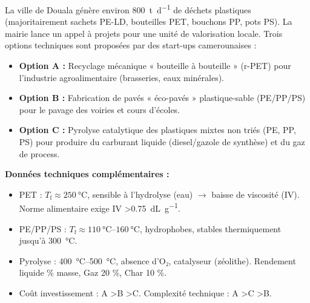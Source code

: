 \documentclass[11pt]{article}
\begin{document}
\begin{exercice}
La ville de Douala génère environ \SI{800}{\tonne\per\day} de déchets plastiques (majoritairement sachets PE-LD, bouteilles PET, bouchons PP, pots PS). La mairie lance un appel à projets pour une unité de valorisation locale. Trois options techniques sont proposées par des start-ups camerounaises :
\begin{itemize}
    \item \textbf{Option A :} Recyclage mécanique « bouteille à bouteille » (r-PET) pour l'industrie agroalimentaire (brasseries, eaux minérales).
    \item \textbf{Option B :} Fabrication de pavés « éco-pavés » plastique-sable (PE/PP/PS) pour le pavage des voiries et cours d'écoles.
    \item \textbf{Option C :} Pyrolyse catalytique des plastiques mixtes non triés (PE, PP, PS) pour produire du carburant liquide (diesel/gazole de synthèse) et du gaz de process.
\end{itemize}

\textbf{Données techniques complémentaires :}
\begin{itemize}
    \item PET : $T_{\text{f}} \approx \SI{250}{\celsius}$, sensible à l'hydrolyse (eau) $\to$ baisse de viscosité (IV). Norme alimentaire exige IV \textgreater \SI{0,75}{\deci\liter\per\gram}.
    \item PE/PP/PS : $T_{\text{f}} \approx \SI{110}{\celsius}$--$\SI{160}{\celsius}$, hydrophobes, stables thermiquement jusqu'à \SI{300}{\celsius}.
    \item Pyrolyse : \SI{400}{\celsius}--\SI{500}{\celsius}, absence d'O₂, catalyseur (zéolithe). Rendement liquide  \% masse, Gaz 20 \%, Char 10 \%.
    \item Coût investissement : A \textgreater B \textgreater C. Complexité technique : A \textgreater C \textgreater B.
\end{itemize}


\end{exercice}
\end{document}
